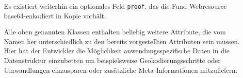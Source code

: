 Es existiert weiterhin ein optionales Feld \texttt{proof}, das die Fund-Webresource base64-enkodiert in Kopie vorhält.

Alle oben genannten Klassen enthalten beliebig weitere Attribute, die vom Namen her unterschiedlich zu den bereits vorgestellten Attributen sein müssen. Hier hat der Entwickler die Möglichkeit anwendungsspezifische Daten in die Datenstruktur einzubetten um beispielsweise Geokodierungsschritte oder Umwandlungen einzusparen oder zusätzliche Meta-Informationen mitzuliefern.

